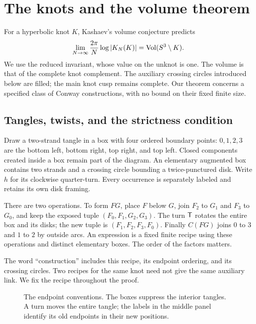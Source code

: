 \section{The knots and the volume theorem}\label{ca:intro}

For a hyperbolic knot $K$, Kashaev's volume conjecture \cite{Kashaev}
predicts
\[
 \lim_{N\to\infty}\frac{2\pi}{N}\log|K_N(K)|
      =\operatorname{Vol}(S^3\setminus K).
\]
We use the reduced invariant, whose value on the unknot is one.
The volume is that of the complete knot complement. The auxiliary
crossing circles introduced below are filled; the main knot cusp
remains complete. Our theorem concerns a specified class of Conway
constructions, with no bound on their fixed finite size.

\subsection{Tangles, twists, and the strictness condition}

Draw a two-strand tangle in a box with four ordered boundary points:
$0,1,2,3$ are the bottom left, bottom right, top right, and top left.
Closed components created inside a box remain part of the diagram.
An elementary augmented box contains two strands and a crossing circle
bounding a twice-punctured disk. Write $h$ for its clockwise quarter-turn.
Every occurrence is separately labeled and retains its own disk framing.

There are two operations. To form $FG$, place $F$ below $G$, join
$F_2$ to $G_1$ and $F_3$ to $G_0$, and keep the exposed tuple
$(F_0,F_1,G_2,G_3)$. The turn $\mathsf T$ rotates the entire box and its
disks; the new tuple is $(F_1,F_2,F_3,F_0)$.
Finally $C(FG)$ joins $0$ to $3$ and $1$ to $2$ by outside arcs.
An expression is a fixed finite recipe using these operations and
distinct elementary boxes. The order of the factors matters.

The word ``construction'' includes this recipe, its endpoint ordering,
and its crossing circles. Two recipes for the same knot need not give
the same auxiliary link. We fix the recipe throughout the proof.

\begin{figure}[ht]
 \centering
 \resizebox{\textwidth}{!}{}
 \caption{The endpoint conventions. The boxes suppress the interior
 tangles. A turn moves the entire tangle; the labels in the middle
 panel identify its old endpoints in their new positions.}
 \label{ca:tangle-figure}
\end{figure}

